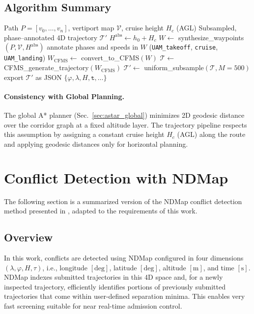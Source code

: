 \subsection{Algorithm Summary}
\begin{algorithm}[H]
\caption{Trajectory Generation from A* Path}
\label{alg:traj_gen}
\begin{algorithmic}[1]
\Require Path $P=[v_0,\dots,v_n]$, vertiport map $\mathcal{V}$, cruise height $H_c$ (AGL)
\Ensure Subsampled, phase–annotated 4D trajectory $\mathcal{T}'$
\State $H^{\text{abs}} \gets h_0 + H_c$ 
\State $W \gets$ synthesize\_waypoints$(P,\mathcal{V},H^{\text{abs}})$
\State annotate phases and speeds in $W$ (\texttt{UAM\_takeoff}, \texttt{cruise}, \texttt{UAM\_landing})
\State $W_{\text{CFMS}} \gets$ convert\_to\_CFMS$(W)$ 
\State $\mathcal{T} \gets$ CFMS\_generate\_trajectory$(W_{\text{CFMS}})$
\State $\mathcal{T}' \gets$ uniform\_subsample$(\mathcal{T}, M=500)$
\State export $\mathcal{T}'$ as JSON $\{\varphi,\lambda,H,\texttt{t},\dots\}$
\end{algorithmic}
\end{algorithm}

\paragraph{Consistency with Global Planning.}
The global A* planner (Sec.~\ref{sec:astar_global}) minimizes 2D geodesic distance over the corridor
graph at a fixed altitude layer. The trajectory pipeline respects this assumption by assigning a
constant cruise height $H_c$ (AGL) along the route and applying geodesic distances only for horizontal planning.

\section{Conflict Detection with NDMap}
\label{sec:ndmap}

The following section is a summarized version of the NDMap conflict detection method presented in \cite{NDMap}, adapted to the requirements of this work.

\subsection*{Overview}
In this work, conflicts are detected using NDMap configured in four dimensions
\((\lambda,\varphi,H,\tau)\), i.e., longitude \([\mathrm{deg}]\), latitude \([\mathrm{deg}]\), altitude \([\mathrm{m}]\), and time \([\mathrm{s}]\).
NDMap indexes submitted trajectories in this 4D space and, for a newly inspected trajectory,
efficiently identifies portions of previously submitted trajectories that come within
user-defined separation minima. This enables very fast screening suitable for near real-time admission control.

